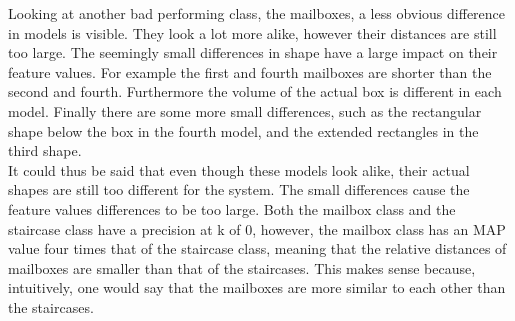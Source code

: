 \documentclass{bigdata}
\begin{document}
\noindent Looking at another bad performing class, the mailboxes, a less obvious difference in models is visible. They look a lot more alike, however their distances are still too large. The seemingly small differences in shape have a large impact on their feature values. For example the first and fourth mailboxes are shorter than the second and fourth. Furthermore the volume of the actual box is different in each model. Finally there are some more small differences, such as the rectangular shape below the box in the fourth model, and the extended rectangles in the third shape. \\
It could thus be said that even though these models look alike, their actual shapes are still too different for the system. The small differences cause the feature values differences to be too large. Both the mailbox class and the staircase class have a precision at k of 0, however, the mailbox class has an MAP value four times that of the staircase class, meaning that the relative distances of mailboxes are smaller than that of the staircases. This makes sense because, intuitively, one would say that the mailboxes are more similar to each other than the staircases. 
\end{document}
